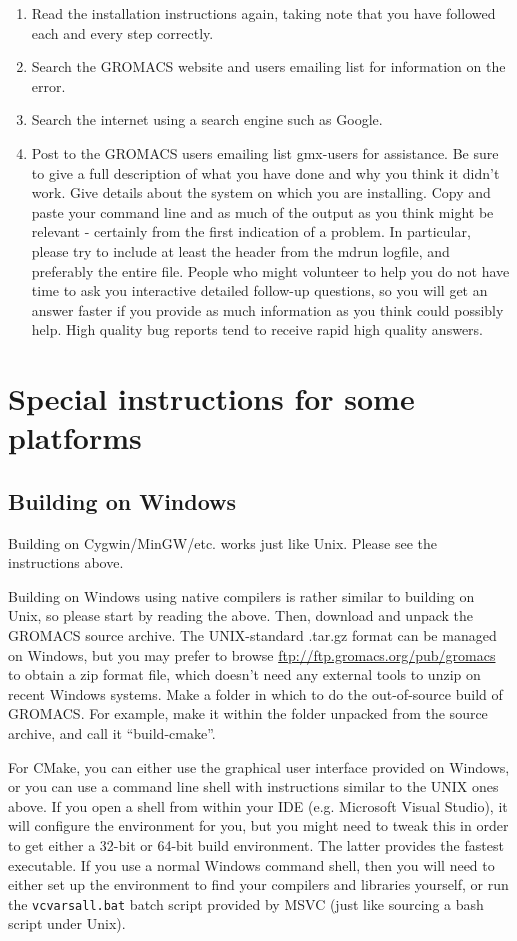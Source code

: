 \documentclass{article}[12pt,a4paper,twoside]
\newcommand{\gromacs}{GROMACS}
\newcommand{\cmake}{CMake}
\begin{document}
\begin{enumerate}
\item Read the installation instructions again, taking note that you
  have followed each and every step correctly.
\item Search the \gromacs{} website and users emailing list for
  information on the error.
\item Search the internet using a search engine such as Google.
\item Post to the \gromacs{} users emailing list gmx-users for
  assistance. Be sure to give a full description of what you have done
  and why you think it didn't work. Give details about the system on
  which you are installing. 
  Copy and paste your command line and as
  much of the output as you think might be relevant - certainly from
  the first indication of a problem. In particular, please try to include at
  least the header from the mdrun logfile, and preferably the entire file.
  People who might volunteer to
  help you do not have time to ask you interactive detailed follow-up
  questions, so you will get an answer faster if you provide as much
  information as you think could possibly help. High quality bug reports 
  tend to receive rapid high quality answers.
\end{enumerate}

\section{Special instructions for some platforms}

\subsection{Building on Windows}
Building on Cygwin/MinGW/etc. works just like Unix. Please see the
instructions above.

Building on Windows using native compilers is rather similar to
building on Unix, so please start by reading the above. Then, download
and unpack the GROMACS source archive. The UNIX-standard .tar.gz
format can be managed on Windows, but you may prefer to browse
\url{ftp://ftp.gromacs.org/pub/gromacs} to obtain a zip format file,
which doesn't need any external tools to unzip on recent Windows
systems. Make a folder in which to do the out-of-source build of
\gromacs{}. For example, make it within the folder unpacked from the
source archive, and call it ``build-cmake''. 

For \cmake{}, you can either use the graphical user interface provided
on Windows, or you can use a command line shell with instructions
similar to the UNIX ones above. If you open a shell from within
your IDE (e.g. Microsoft Visual Studio), it will configure the
environment for you, but you might need to tweak this in order to 
get either a 32-bit or 64-bit build environment. The latter provides the
fastest executable. If you use a normal Windows command shell, then
you will need to either set up the environment to find your compilers
and libraries yourself, or run the \verb+vcvarsall.bat+ batch script
provided by MSVC (just like sourcing a bash script under
Unix). 
\end{document}
